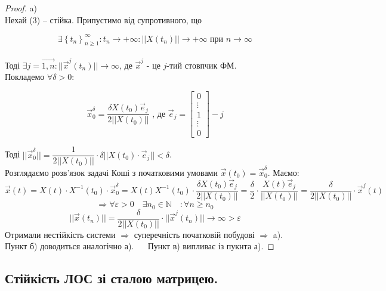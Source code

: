 \documentclass[14pt,a4paper]{scrartcl}
\theoremstyle{definition}
\theoremstyle{definition}
\theoremstyle{definition}
\begin{document}
\begin{proof}
a) \fbox{$\Longrightarrow$} \\ Нехай (3) -- стійка. Припустимо від супротивного, що

$$\exists  \left\lbrace t_n \right\rbrace_{n\geq 1}^{\infty} : t_n \rightarrow +\infty : ||X(t_n)|| \to {+\infty} \text{ при } n \to \infty$$\\
Тоді $\exists j = \overrightarrow{1, n} : || \overrightarrow{x}^{j} (t_n)|| \to \infty$, де $\overrightarrow{x}^j$  - це $j$-тий стовпчик ФМ. \\ Покладемо $\forall \delta > 0:$


$$
\overrightarrow{x}^{\delta}_0 = \frac{\delta X(t_0) \overrightarrow{e}_j}{2 ||X(t_0)||} \text{ , де }\overrightarrow{e}_j = \begin{bmatrix}
0\\
\vdots\\
1\\
\vdots\\
0
\end{bmatrix} - j
$$

Тоді $|| \overrightarrow{x}_0^{\delta}|| = \dfrac{1}{ 2 ||X(t_0)||}  \cdot \delta ||X(t_0) \cdot \overrightarrow{e}_j|| < \delta $.\\
Розглядаємо розв'язок задачі Коші з початковими умовами $ \overrightarrow{x} (t_0) = \overrightarrow{x} _0 ^ \delta$. Маємо:
$$
\overrightarrow{x} (t) = X(t) \cdot X^{-1}(t_0) \cdot \overrightarrow{x}_0 ^\delta = X(t) X^{-1} (t_0) \cdot \dfrac{ \delta X(t_0) \overrightarrow{e}_j}{ 2 ||X(t_0)||} = \frac{\delta}{2} \cdot \frac{X(t) \overrightarrow{e}_j}{ ||X(t_0)||} = \frac{\delta}{2 ||X(t_0)|| } \cdot \overrightarrow{x}^j (t)
$$
$$
\Longrightarrow \forall \varepsilon >0 \quad \exists n_0 \in \mathbb{N} \quad : \forall n \geq n_0
$$
$$
||\overrightarrow{x} (t_n)|| = \frac{\delta}{ 2 ||X(t_0)|| } \cdot ||\overrightarrow{x}^j (t_n)|| \to \infty > \varepsilon
$$
Отримали нестійкість системи $ \Rightarrow  $ суперечність початковій побудові $ \Rightarrow$ a).\\
Пункт б) доводиться аналогічно а). $\quad$ Пункт в) випливає із пукнта а).
\end{proof}

\subsection{Стійкість ЛОС зі сталою матрицею.}
\end{document}
